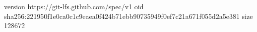 version https://git-lfs.github.com/spec/v1
oid sha256:221950f1e0ca0c1c9eaea0f424b71ebb90735949f0ef7c21a671f055d2a5e381
size 128672
